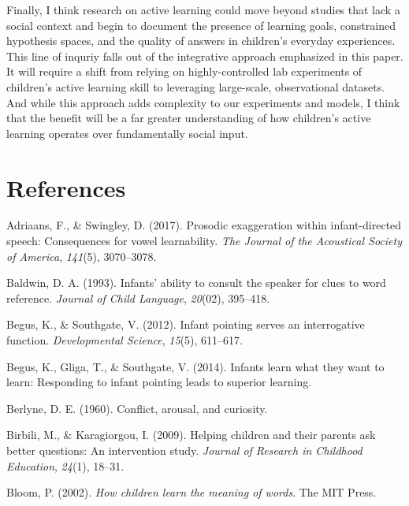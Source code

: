 \documentclass[english,floatsintext,man]{apa6}
\theoremstyle{definition}
\theoremstyle{definition}
\theoremstyle{definition}
\theoremstyle{remark}
\begin{document}
Finally, I think research on active learning could move beyond studies
that lack a social context and begin to document the presence of
learning goals, constrained hypothesis spaces, and the quality of
answers in children's everyday experiences. This line of inquriy falls
out of the integrative approach emphasized in this paper. It will
require a shift from relying on highly-controlled lab experiments of
children's active learning skill to leveraging large-scale,
observational datasets. And while this approach adds complexity to our
experiments and models, I think that the benefit will be a far greater
understanding of how children's active learning operates over
fundamentally social input.

\newpage

\section{References}\label{references}

\setlength{\parindent}{-0.5in} \setlength{\leftskip}{0.5in}

\hypertarget{refs}{}
\hypertarget{ref-adriaans2017prosodic}{}
Adriaans, F., \& Swingley, D. (2017). Prosodic exaggeration within
infant-directed speech: Consequences for vowel learnability. \emph{The
Journal of the Acoustical Society of America}, \emph{141}(5),
3070--3078.

\hypertarget{ref-baldwin1993infants}{}
Baldwin, D. A. (1993). Infants' ability to consult the speaker for clues
to word reference. \emph{Journal of Child Language}, \emph{20}(02),
395--418.

\hypertarget{ref-begus2012infant}{}
Begus, K., \& Southgate, V. (2012). Infant pointing serves an
interrogative function. \emph{Developmental Science}, \emph{15}(5),
611--617.

\hypertarget{ref-begus2014infants}{}
Begus, K., Gliga, T., \& Southgate, V. (2014). Infants learn what they
want to learn: Responding to infant pointing leads to superior learning.

\hypertarget{ref-berlyne1960conflict}{}
Berlyne, D. E. (1960). Conflict, arousal, and curiosity.

\hypertarget{ref-birbili2009helping}{}
Birbili, M., \& Karagiorgou, I. (2009). Helping children and their
parents ask better questions: An intervention study. \emph{Journal of
Research in Childhood Education}, \emph{24}(1), 18--31.

\hypertarget{ref-bloom2002children}{}
Bloom, P. (2002). \emph{How children learn the meaning of words}. The
MIT Press.
\end{document}
